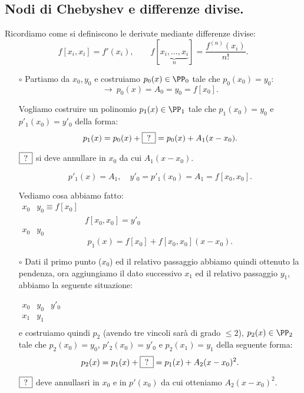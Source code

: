 \subsection{Nodi di Chebyshev e differenze divise.}
Ricordiamo come si definiscono le derivate mediante differenze divise:
\[
f[x_i, x_i] = f'(x_i), \qquad f[\underbrace{x_i, \ldots, x_i}_{n}] = 
\frac{f^{(n)}(x_i)}{n!}.
\]

\begin{itemize}
\item[$\circ$]
Partiamo da $x_0, y_0$ e costruiamo $p_0(x) \in \PP_0$ tale che $p_0(x_0)=y_0$:
\[\longrightarrow \ p_0(x) = A_0 = y_0 = f[x_0]. \]

Vogliamo costruire un polinomio $p_1(x) \in \PP_1$ tale che $p_1(x_0) = y_0$
e $p'_1(x_0) = y'_0$ della forma:
\[
p_1(x) = p_0(x) + \framebox[3.5\width]{\textrm{?}} = p_0(x) + A_1(x-x_0).
\]

$\framebox[3.5\width]{\textrm{?}}$ si deve annullare in $x_0$ da cui
$A_1(x-x_0)$.

\[
p'_1(x) = A_1, \quad y'_0 = p'_1(x_0) = A_1 = f[x_0,x_0].
\]

Vediamo cosa abbiamo fatto:\\

$\begin{array}{llcc}
x_0 & y_0 \equiv f[x_0]  &   \\
    &     & f[x_0,x_0] = y'_0 \\
x_0 & y_0     
\end{array}$
\[p_1(x) = f[x_0] + f[x_0,x_0](x-x_0).\]

\item[$\circ$]
Dati il primo punto ($x_0$) ed il relativo passaggio abbiamo quindi ottenuto
la pendenza, ora aggiungiamo il dato successivo $x_1$ ed il relativo passaggio
$y_1$, abbiamo la seguente situazione:

$\begin{array}{lllc}
x_0 & y_0  & y'_0  \\
x_1 & y_1     \\
\end{array}$\\
e costruiamo quindi $p_2$ (avendo tre vincoli sarà di grado $\leq 2$),
$p_2(x) \in \PP_2$ tale che $p_2(x_0) = y_0$, $p'_2(x_0) = y'_0$ e $p_2(x_1) =
y_1$ della seguente forma:
\[
p_2(x) = p_1(x) + \framebox[3.5\width]{\textrm{?}} = p_1(x) + A_2(x-x_0)^2.
\]

$\framebox[3.5\width]{\textrm{?}}$ deve annullasri in $x_0$ e in $p'(x_0)$
da cui otteniamo $A_2(x-x_0)^2$.


\end{itemize}
